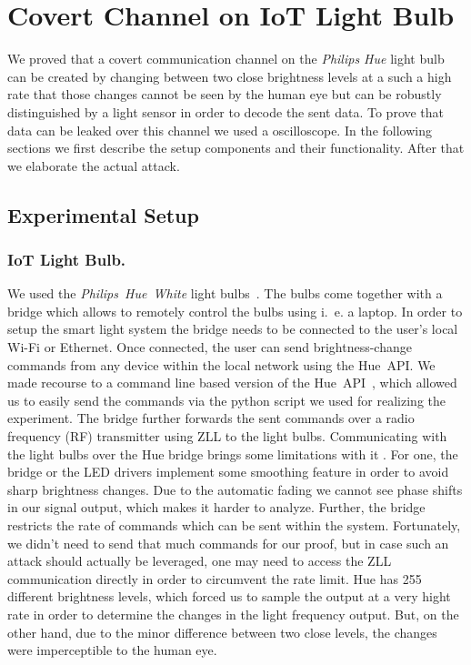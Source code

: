 \section{Covert Channel on IoT Light Bulb}
\label{sec:experiment}

We proved that a covert communication channel on the \textit{Philips Hue} light bulb can be created by changing between two close brightness levels at a such a high rate that those changes cannot be seen by the human eye but can be robustly distinguished by a light sensor in order to decode the sent data. To prove that data can be leaked over this channel we used a oscilloscope. In the following sections we first describe the setup components and their functionality. After that we elaborate the actual attack.\newline

\subsection{Experimental Setup}
\label{sec:setup}


\subsubsection{IoT Light Bulb.} We used the \textit{Philips~Hue~White} light bulbs~\cite{Philips:2018:Hue}. The bulbs come together with a bridge which allows to remotely control the bulbs using i.~e. a laptop. In order to setup the smart light system the bridge needs to be connected to the user's local Wi-Fi or Ethernet. Once connected, the user can send brightness-change commands from any device within the local network using the Hue~API. We made recourse to a command line based version of the Hue~API~\cite{Bahamas10:2018:HueApi}, which allowed us to easily send the commands via the python script we used for realizing the experiment. The bridge further forwards the sent commands over a radio frequency (RF) transmitter using ZLL to the light bulbs.\newline
Communicating with the light bulbs over the Hue bridge brings some limitations with it \cite{Ronen:2016:EFAIDCSL}. For one, the bridge or the LED drivers implement some smoothing feature in order to avoid sharp brightness changes. Due to the automatic fading we cannot see phase shifts in our signal output, which makes it harder to analyze. Further, the bridge restricts the rate of commands which can be sent within the system. Fortunately, we didn't need to send that much commands for our proof, but in case such an attack should actually be leveraged, one may need to access the ZLL communication directly in order to circumvent the rate limit.\newline
Hue has 255 different brightness levels, which forced us to sample the output at a very hight rate in order to determine the changes in the light frequency output. But, on the other hand, due to the minor difference between two close levels, the changes were imperceptible to the human eye.

